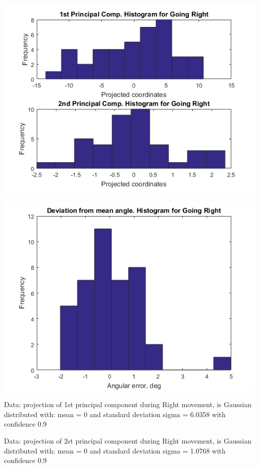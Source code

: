\documentclass[a4paper, 12pt]{article}
\begin{document}
\begin{center}
  \includegraphics[scale=0.6]{rr2}
  
  
  \includegraphics[scale=0.6]{rr3}
\end{center}


Data: projection of 1st principal component during  Right movement, is Gaussian distributed with: mean = 0 and standard deviation sigma = 6.0358 with confidence 0.9%






\smallskip

Data: projection of 2st principal component during  Right movement, is Gaussian distributed with: mean = 0 and standard deviation sigma = 1.0768 with confidence 0.9%
\end{document}
